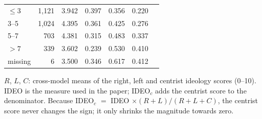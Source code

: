 \begin{table}[ht]
{\begin{tabular}{lrrrrrr}
\midrule
$\le 3$ & 1,121 & 3.942 & 0.397 & 0.356 & 0.220 & \\
3--5 & 1,024 & 4.395 & 0.361 & 0.425 & 0.276 & \\
5--7 & 703 & 4.381 & 0.315 & 0.483 & 0.337 & \\
$>7$ & 339 & 3.602 & 0.239 & 0.530 & 0.410 & \\
missing & 6 & 3.500 & 0.346 & 0.617 & 0.412 & \\
\bottomrule
\end{tabular}}
\par\smallskip
\begin{minipage}{\linewidth}\scriptsize $R$, $L$, $C$: cross-model means of the right, left and centrist ideology scores (0--10). IDEO is the measure used in the paper; IDEO$_{c}$ adds the centrist score to the denominator. Because IDEO$_{c}$ $=$ IDEO $\times(R+L)/(R+L+C)$, the centrist score never changes the sign; it only shrinks the magnitude towards zero.\end{minipage}
\end{table}
